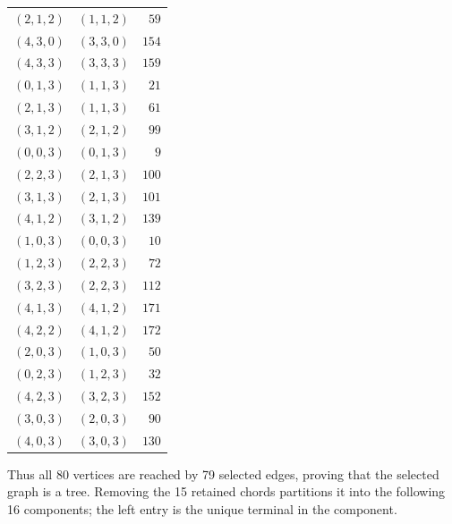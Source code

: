 \begin{longtable}{@{}rrr@{}}
$(2,1,2)$ & $(1,1,2)$ & $59$\\
$(4,3,0)$ & $(3,3,0)$ & $154$\\
$(4,3,3)$ & $(3,3,3)$ & $159$\\
$(0,1,3)$ & $(1,1,3)$ & $21$\\
$(2,1,3)$ & $(1,1,3)$ & $61$\\
$(3,1,2)$ & $(2,1,2)$ & $99$\\
$(0,0,3)$ & $(0,1,3)$ & $9$\\
$(2,2,3)$ & $(2,1,3)$ & $100$\\
$(3,1,3)$ & $(2,1,3)$ & $101$\\
$(4,1,2)$ & $(3,1,2)$ & $139$\\
$(1,0,3)$ & $(0,0,3)$ & $10$\\
$(1,2,3)$ & $(2,2,3)$ & $72$\\
$(3,2,3)$ & $(2,2,3)$ & $112$\\
$(4,1,3)$ & $(4,1,2)$ & $171$\\
$(4,2,2)$ & $(4,1,2)$ & $172$\\
$(2,0,3)$ & $(1,0,3)$ & $50$\\
$(0,2,3)$ & $(1,2,3)$ & $32$\\
$(4,2,3)$ & $(3,2,3)$ & $152$\\
$(3,0,3)$ & $(2,0,3)$ & $90$\\
$(4,0,3)$ & $(3,0,3)$ & $130$\\
\bottomrule
\end{longtable}
Thus all 80 vertices are reached by 79 selected edges, proving that the selected graph is a tree.  Removing the 15 retained chords partitions it into the following 16 components; the left entry is the unique terminal in the component.
